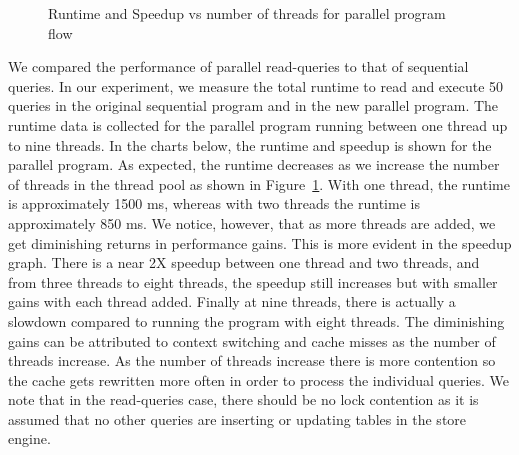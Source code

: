 \documentclass[11pt,journal,compsoc]{IEEEtran}
\begin{document}
\begin{figure}
\captionsetup{justification=centering}
\centerline{
\hfill
{}}
\caption{Runtime and Speedup vs number of threads for parallel program flow}
\label{fig:speedup_reads}
\end{figure} 

We compared the performance of parallel read-queries to that of sequential queries. In our experiment, we measure the total runtime to read and execute 50 queries in the original sequential program and in the new parallel program. The runtime data is collected for the parallel program running between one thread up to nine threads. In the charts below, the runtime and speedup is shown for the parallel program. As expected, the runtime decreases as we increase the number of threads in the thread pool as shown in Figure~\ref{fig:speedup_reads}. With one thread, the runtime is approximately 1500 ms, whereas with two threads the runtime is approximately 850 ms. We notice, however, that as more threads are added, we get diminishing returns in performance gains. This is more evident in the speedup graph. There is a near 2X speedup between one thread and two threads, and from three threads to eight threads, the speedup still increases but with smaller gains with each thread added. Finally at nine threads, there is actually a slowdown compared to running the program with eight threads. The diminishing gains can be attributed to context switching and cache misses as the number of threads increase. As the number of threads increase there is more contention so the cache gets rewritten more often in order to process the individual queries. We note that in the read-queries case, there should be no lock contention as it is assumed that no other queries are inserting or updating tables in the store engine.
\end{document}

